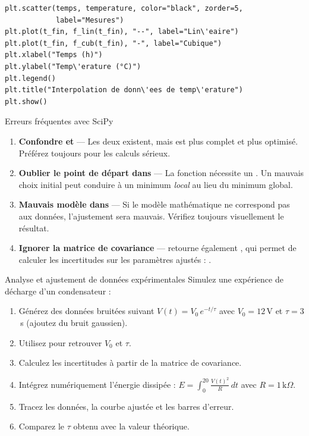 \begin{codeblock}[title=\textbf{Python}]
\begin{verbatim}
plt.scatter(temps, temperature, color="black", zorder=5,
            label="Mesures")
plt.plot(t_fin, f_lin(t_fin), "--", label="Lin\'eaire")
plt.plot(t_fin, f_cub(t_fin), "-", label="Cubique")
plt.xlabel("Temps (h)")
plt.ylabel("Temp\'erature (°C)")
plt.legend()
plt.title("Interpolation de donn\'ees de temp\'erature")
plt.show()
\end{verbatim}
\end{codeblock}

\begin{errmark}{Erreurs fr\'equentes avec SciPy}
\begin{enumerate}
  \item \textbf{Confondre  et } ---
    Les deux existent, mais  est plus complet et plus optimis\'e.
    Pr\'ef\'erez toujours  pour les calculs s\'erieux.
  \item \textbf{Oublier le point de d\'epart dans } ---
    La fonction  n\'ecessite un . Un mauvais choix initial peut
    conduire \`a un minimum \emph{local} au lieu du minimum global.
  \item \textbf{Mauvais mod\`ele dans } --- Si le mod\`ele math\'ematique
    ne correspond pas aux donn\'ees, l'ajustement sera mauvais. V\'erifiez toujours
    visuellement le r\'esultat.
  \item \textbf{Ignorer la matrice de covariance} ---  retourne
    \'egalement , qui permet de calculer les incertitudes sur les param\`etres
    ajust\'es : .
\end{enumerate}
\end{errmark}

\begin{projet}{Analyse et ajustement de donn\'ees exp\'erimentales}
Simulez une exp\'erience de d\'echarge d'un condensateur :
\begin{enumerate}
  \item G\'en\'erez des donn\'ees bruit\'ees suivant $V(t) = V_0 \, e^{-t/\tau}$
    avec $V_0 = 12$\,V et $\tau = 3$\,s (ajoutez du bruit gaussien).
  \item Utilisez  pour retrouver $V_0$ et $\tau$.
  \item Calculez les incertitudes \`a partir de la matrice de covariance.
  \item Int\'egrez num\'eriquement l'\'energie dissip\'ee :
    $E = \int_0^{20} \frac{V(t)^2}{R}\,dt$ avec $R = 1\,\text{k}\Omega$.
  \item Tracez les donn\'ees, la courbe ajust\'ee et les barres d'erreur.
  \item Comparez le $\tau$ obtenu avec la valeur th\'eorique.
\end{enumerate}
\end{projet}

